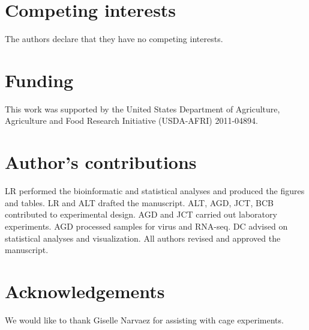 \documentclass{bmcart}
\begin{document}
\begin{linenumbers}
\begin{backmatter}
\section*{Competing interests}
  The authors declare that they have no competing interests.

\section*{Funding}
  This work was supported by the United States Department of Agriculture, Agriculture and Food Research Initiative (USDA-AFRI) 2011-04894.

\section*{Author's contributions}
  LR performed the bioinformatic and statistical analyses and produced the figures and tables. LR and ALT drafted the manuscript. ALT, AGD, JCT, BCB contributed to experimental design. AGD and JCT carried out laboratory experiments. AGD processed samples for virus and RNA-seq. DC advised on statistical analyses and visualization. All authors revised and approved the manuscript.
    
\section*{Acknowledgements}
  We would like to thank Giselle Narvaez for assisting with cage experiments.
  



\end{backmatter}
\end{linenumbers}
\end{document}
